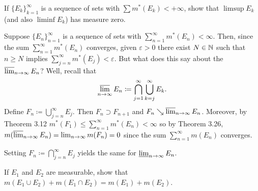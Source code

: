\begin{problem}
  If ${\{E_k\}}_{k=1}^\infty$ is a sequence of sets with
  $\sum m^*(E_k)<+\infty$, show that $\limsup E_k$ (and also $\liminf E_k$)
  has measure zero.
\end{problem}
\begin{solution}
  Suppose ${\{E_n\}}_{n=1}^\infty$ is a sequence of sets with
  $\sum_{n=1}^\infty m^*(E_n)<\infty$. Then, since the sum
  $\sum_{n=1}^\infty m^*(E_n)$ converges, given $\varepsilon>0$ there
  exist $N\in\mathbb{N}$ such that $n\geq N$ implies
  $\sum_{j=n}^\infty m^*(E_j)<\varepsilon$. But what does this say about
  the $\varlimsup_{n\to\infty} E_n$? Well, recall that
  \[
    \varlimsup_{n\to\infty}
    E_n\coloneq\bigcap_{j=1}^\infty\bigcup_{k=j}^\infty E_k.
  \]
  Define $F_n\coloneq\bigcup_{j=n}^\infty E_j$. Then $F_n\supset F_{n+1}$
  and $F_n\searrow\varlimsup_{n\to\infty} E_n$. Moreover, by Theorem 3.12
  $m^*(F_1)\leq\sum_{n=1}^\infty m^*(E_n)<\infty$ so by Theorem 3.26,
  $m(\varlimsup_{n\to\infty} E_n)=\lim_{n\to\infty}m(F_n)=0$ since the sum
  $\sum_{n=1}^\infty m(E_n)$ converges.

  Setting $F_n\coloneq\bigcap_{j=n}^\infty E_j$ yields the same for
  $\varliminf_{n\to\infty} E_n$.
\end{solution}

\begin{problem}
  If $E_1$ and $E_2$ are measurable, show that
  $m(E_1\cup E_2)+m(E_1\cap E_2)=m(E_1)+m(E_2)$.
\end{problem}
\begin{solution}
\end{solution}

